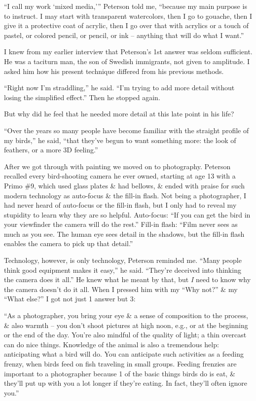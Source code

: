 \documentclass{article}
\numberwithin{equation}{section}
\begin{document}
``I call my work `mixed media,''' Peterson told me, ``because my main purpose is to instruct. I may start with transparent watercolors, then I go to gouache, then I give it a protective coat of acrylic, then I go over that with acrylics or a touch of pastel, or colored pencil, or pencil, or ink -- anything that will do what I want.''

I knew from my earlier interview that Peterson's 1st answer was seldom sufficient. He was a taciturn man, the son of Swedish immigrants, not given to amplitude. I asked him how his present technique differed from his previous methods.

``Right now I'm straddling,'' he said. ``I'm trying to add more detail without losing the simplified effect.'' Then he stopped again.

But why did he feel that he needed more detail at this late point in his life?

``Over the years so many people have become familiar with the straight profile of my birds,'' he said, ``that they've begun to want something more: the look of feathers, or a more 3D feeling.''

After we got through with painting we moved on to photography. Peterson recalled every bird-shooting camera he ever owned, starting at age 13 with a Primo \#9, which used glass plates \& had bellows, \& ended with praise for such modern technology as auto-focus \& the fill-in flash. Not being a photographer, I had never heard of auto-focus or the fill-in flash, but I only had to reveal my stupidity to learn why they are so helpful. Auto-focus: ``If you can get the bird in your viewfinder the camera will do the rest.'' Fill-in flash: ``Film never sees as much as you see. The human eye sees detail in the shadows, but the fill-in flash enables the camera to pick up that detail.''

Technology, however, is only technology, Peterson reminded me. ``Many people think good equipment makes it easy,'' he said. ``They're deceived into thinking the camera does it all.'' He knew what he meant by that, but \textit{I} need to know why the camera doesn't do it all. When I pressed him with my ``Why not?'' \& my ``What else?'' I got not just 1 answer but 3:

``As a photographer, you bring your eye \& a sense of composition to the process, \& also warmth -- you don't shoot pictures at high noon, e.g., or at the beginning or the end of the day. You're also mindful of the quality of light; a thin overcast can do nice things. Knowledge of the animal is also a tremendous help: anticipating what a bird will do. You can anticipate such activities as a feeding frenzy, when birds feed on fish traveling in small groups. Feeding frenzies are important to a photographer because 1 of the basic things birds do is eat, \& they'll put up with you a lot longer if they're eating. In fact, they'll often ignore you.''
\end{document}
